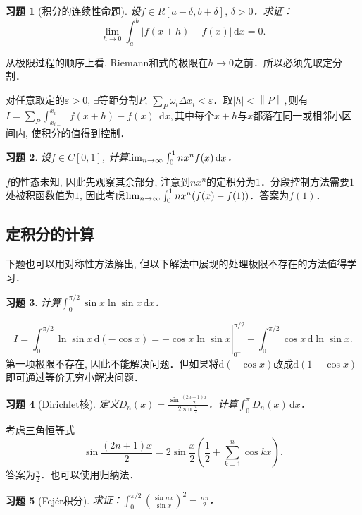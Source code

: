 \documentclass[11pt,a4paper]{ctexart}
\makeatletter
\theoremstyle{thmseries} %
\theoremstyle{exerseries}
\newtheorem{exer}{习题}[section]
\renewenvironment{proof}[1][\proofname]{\par
  \pushQED{\qed}%
  \normalfont \topsep6\p@\@plus6\p@\relax
  \trivlist
  \item[\hskip\labelsep
        \itshape
    #1\@addpunct{}]\ignorespaces
}{%
  \popQED\endtrivlist\@endpefalse
}
\newenvironment{sol}{\begin{proof}[\bfseries\upshape 解\quad]}{\end{proof}}
\newenvironment{pf}{\begin{proof}[\bfseries\upshape 证\quad]}{\end{proof}}
\newcommand{\bra}[1]{\mathopen{}\left(#1\right)}
\renewcommand{\epsilon}{\varepsilon}
\renewcommand{\d}{\mathrm{d}}
\def \nti {\mathnormal{n}\to\infty}
\newcommand{\norm}[1]{\left\lVert #1 \right\rVert}
\makeatother
\begin{document}
\begin{exer}[积分的连续性命题]
	设$f\in R[a-\delta,b+\delta],\,\delta>0$．求证：
	\[\lim_{h\to0}\int_{a}^{b}|f(x+h)-f(x)|\,\d x=0.\]
\end{exer}
\begin{pf}
	从极限过程的顺序上看, Riemann和式的极限在$h\to0$之前．所以必须先取定分割．
	
	对任意取定的$\epsilon>0,\,\exists$等距分割$P,\,\sum_P \omega_i\Delta x_i<\epsilon$．取$|h|<\norm{P},$则有
	$I=\sum_P \int_{x_{i-1}}^{x_i}|f(x+h)-f(x)|\,\d x,$其中每个$x+h$与$x$都落在同一或相邻小区间内, 使积分的值得到控制．
\end{pf}

\begin{exer}
	设$f\in C[0,1]$, 计算$\lim_{\nti}\int_{0}^{1}nx^nf(x)\,\d x$．
\end{exer}
\begin{sol}
	$f$的性态未知, 因此先观察其余部分, 注意到$nx^n$的定积分为$1$．分段控制方法需要$1$处被积函数值为$1$, 因此考虑$\lim_{\nti}\int_{0}^{1}nx^n\bra{f(x)-f(1)}$．答案为$f(1)$．
\end{sol}


\subsection{定积分的计算}
下题也可以用对称性方法解出, 但以下解法中展现的处理极限不存在的方法值得学习．
\begin{exer}
	计算$\int_{0}^{\pi/2}\sin x\ln\sin x\,\d x$．
\end{exer}
\begin{sol}
	\[\left.I=\int_{0}^{\pi/2}\ln\sin x\,\d(-\cos x)=-\cos x\ln\sin x\right|_{0^+}^{\pi/2}+\int_{0}^{\pi/2}\cos x\,\d\ln\sin x.\]
	第一项极限不存在, 因此不能解决问题．但如果将$\d(-\cos x)$改成$\d(1-\cos x)$即可通过等价无穷小解决问题．
\end{sol}

\begin{exer}[Dirichlet核]
	定义$D_n(x)=\frac{\sin\frac{(2n+1)x}{2}}{2\sin\frac{x}{2}}$．计算$\int_{0}^{\pi}D_n(x)\,\d x$．
\end{exer}
\begin{sol}
	考虑三角恒等式
	\[\sin\frac{(2n+1)x}{2}=2\sin\frac{x}{2}\bra{\frac{1}{2}+\sum_{k=1}^{n}\cos kx}.\]
	答案为$\frac{\pi}{2}$．也可以使用归纳法．
\end{sol}

\begin{exer}[Fejér积分]
	求证：$\int_{0}^{\pi/2}\bra{\frac{\sin nx}{\sin x}}^2=\frac{n\pi}{2}$．
\end{exer}
\end{document}
